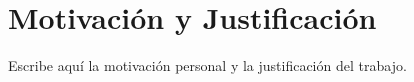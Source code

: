 \chapter*{Motivación y Justificación}
Escribe aquí la motivación personal y la justificación del trabajo.
